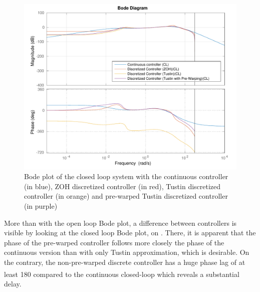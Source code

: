 \begin{figure}[H]
  \centering
  \includegraphics[scale=.6]{figures/zohVsPrewarpVsNoPrewarpVsContinuousBodeClosedLoop.pdf}
  \caption{Bode plot of the closed loop system with the continuous controller (in blue), ZOH discretized controller (in red), Tustin discretized controller (in orange) and pre-warped Tustin discretized controller (in purple)}
  \label{fig:bodePrewarpVsNoPrewarpVsContinuousClosedLoop}
\end{figure}
%
More than with the open loop Bode plot, a difference between controllers is visible by looking at the closed loop Bode plot, on . There, it is apparent that the phase of the pre-warped controller follows more closely the phase of the continuous version than with only Tustin approximation, which is desirable. On the contrary, the non-pre-warped discrete controller has a huge phase lag of at least \si{180^{\circ}} compared to the continuous closed-loop which reveals a substantial delay.

